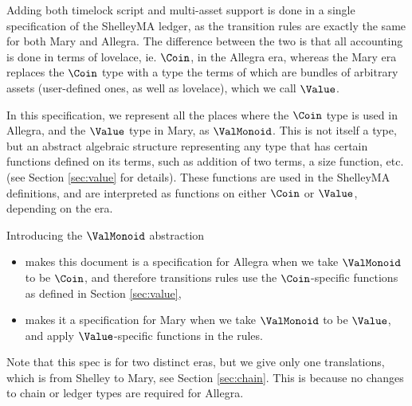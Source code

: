 Adding both timelock script and multi-asset support is done in a single specification
of the ShelleyMA ledger, as the transition rules are exactly the same for both
Mary and Allegra. The difference between the two is that all accounting is
done in terms of lovelace, ie. $\Coin$, in the Allegra era, whereas the Mary era
replaces the $\Coin$ type with a type the terms of which are bundles of arbitrary assets
(user-defined ones, as well as lovelace), which we call $\Value$.

In this specification, we represent all the places where the $\Coin$ type is used in Allegra,
and the $\Value$ type in Mary, as $\ValMonoid$. This is not itself a type, but an
abstract algebraic structure representing any type that has certain functions defined on its terms,
such as addition of two terms,
a size function, etc. (see Section \ref{sec:value} for details). These functions
are used in the ShelleyMA definitions, and are interpreted as functions on either
$\Coin$ or $\Value$, depending on the era.

Introducing the $\ValMonoid$ abstraction
\begin{itemize}
  \item makes this document is a specification for Allegra when we take $\ValMonoid$
  to be $\Coin$, and therefore transitions rules use the $\Coin$-specific functions
  as defined in Section \ref{sec:value},
  \item makes it a specification for Mary when we take $\ValMonoid$ to be
  $\Value$, and apply $\Value$-specific functions in the rules.
\end{itemize}

Note that this spec is for two distinct eras, but we give only one translations, which is
from Shelley to Mary, see Section \ref{sec:chain}. This is because no changes to
chain or ledger types are required for Allegra.

